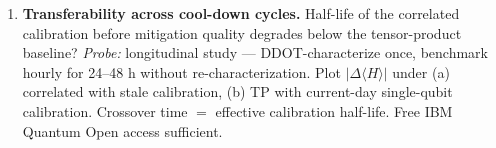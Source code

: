 \begin{enumerate}
\item \textbf{Transferability across cool-down cycles.}
Half-life of the correlated calibration before mitigation quality degrades
below the tensor-product baseline?
\emph{Probe:} longitudinal study --- DDOT-characterize once, benchmark hourly
for 24--48 h without re-characterization. Plot $|\Delta\langle H\rangle|$
under (a) correlated with stale calibration, (b) TP with current-day
single-qubit calibration. Crossover time $=$ effective calibration half-life.
Free IBM Quantum Open access sufficient.

\end{enumerate}
